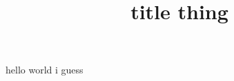 \documentclass{article}
\title{title thing}
\begin{document}
  \maketitle
  \newpage
  \noindent
  hello world i guess
\end{document}
